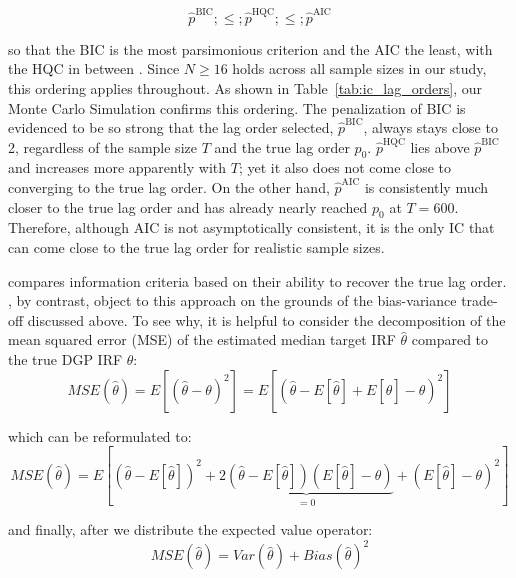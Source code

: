 \documentclass[12pt, a4paper]{article}
\begin{document}
\begin{equation} \label{eq:IC_comp}
\hat{p}^{\mathrm{BIC}} ;\leq; \hat{p}^{\mathrm{HQC}} ;\leq; \hat{p}^{\mathrm{AIC}}
\end{equation}

so that the BIC is the most parsimonious criterion and the AIC the least, with the HQC in between \citep{ivanovPractitionersGuideLag2005}. Since $N \ge 16$ holds across all sample sizes in our study, this ordering applies throughout. As shown in Table~\ref {tab:ic_lag_orders}, our Monte Carlo Simulation confirms this ordering. The penalization of BIC is evidenced to be so strong that the lag order selected, $\hat{p}^{\mathrm{BIC}}$, always stays close to 2, regardless of the sample size $T$ and the true lag order $p_0$. $\hat{p}^{\mathrm{HQC}}$ lies above $\hat{p}^{\mathrm{BIC}}$ and increases more apparently with $T$; yet it also does not come close to converging to the true lag order. On the other hand, $\hat{p}^{\mathrm{AIC}}$ is consistently much closer to the true lag order and has already nearly reached $p_0$ at $T=600$. Therefore, although AIC is not asymptotically consistent, it is the only IC that can come close to the true lag order for realistic sample sizes.



\citet{lutkepohlComparisonCriteriaEstimating1985} compares information criteria based on their ability to recover the true lag order. \citet{ivanovPractitionersGuideLag2005}, by contrast, object to this approach on the grounds of the bias-variance trade-off discussed above. To see why, it is helpful to consider the decomposition of the mean squared error (MSE) of the estimated median target IRF $\hat \theta$ compared to the true DGP IRF $\theta$:
\begin{equation} \label{eq:MSE}
MSE(\hat \theta) = E[(\hat \theta - \theta)^2] = E[(\hat \theta - E[\hat \theta] + E[\hat \theta] - \theta)^{2}]
\end{equation}

which can be reformulated to:
\begin{equation} \label{eq:MSE2}
MSE(\hat \theta) = E \left[ \left(\hat \theta - E[\hat \theta] \right)^{2} + \underbrace{2\left(\hat \theta - E[\hat \theta] \right)\left(E[\hat\theta]-\theta\right)}_{= 0} + \left(E[\hat\theta]-\theta \right)^{2} \right]
\end{equation}

and finally, after we distribute the expected value operator:
\begin{equation} \label{eq:MSE3}
MSE(\hat \theta) = Var(\hat \theta) + Bias(\hat\theta)^{2}
\end{equation}
\end{document}
